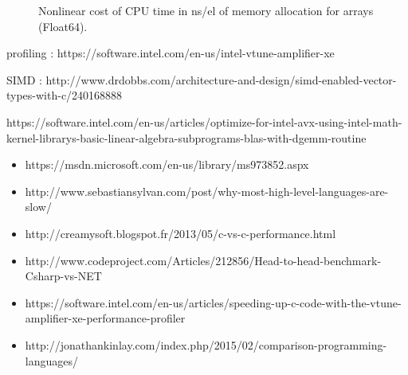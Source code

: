 \begin{figure}[h]
\begin{center}
\end{center}
\caption{Nonlinear cost of CPU time in ns/el of memory allocation for arrays (Float64).}
\end{figure}





\newpage

profiling :
https://software.intel.com/en-us/intel-vtune-amplifier-xe


SIMD :
http://www.drdobbs.com/architecture-and-design/simd-enabled-vector-types-with-c/240168888

https://software.intel.com/en-us/articles/optimize-for-intel-avx-using-intel-math-kernel-librarys-basic-linear-algebra-subprograms-blas-with-dgemm-routine

\begin{itemize}
\item https://msdn.microsoft.com/en-us/library/ms973852.aspx
\item http://www.sebastiansylvan.com/post/why-most-high-level-languages-are-slow/
\item http://creamysoft.blogspot.fr/2013/05/c-vs-c-performance.html
\item http://www.codeproject.com/Articles/212856/Head-to-head-benchmark-Csharp-vs-NET
\item https://software.intel.com/en-us/articles/speeding-up-c-code-with-the-vtune-amplifier-xe-performance-profiler
\item http://jonathankinlay.com/index.php/2015/02/comparison-programming-languages/
\end{itemize}









